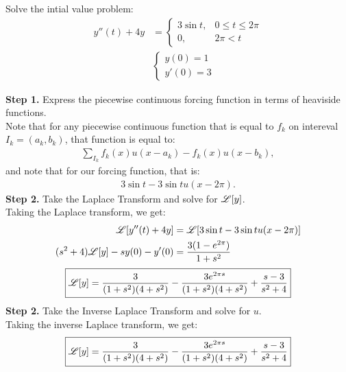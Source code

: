 \documentclass[11pt]{article}
\begin{document}
    \newpage 
    \begin{problem}
        Solve the intial value problem:
        \begin{align}
            y''(t) + 4y &= 
            \begin{cases}
            3\sin t, &0\le t \le 2\pi \\ 
            0, &2\pi<t   \end{cases} \\
            &\begin{cases}
                y(0) = 1 \\
                y'(0) = 3
            \end{cases}
        \end{align}
    \end{problem}
    \begin{solution}
        \textbf{Step 1.} Express the piecewise continuous forcing function in terms of heaviside functions. \\
        Note that for any piecewise continuous function that is equal to $f_k$ on intereval $I_k = (a_k,b_k)$, that function is equal to:
        \begin{align}
            \sum_{I_k} f_k(x)u(x-a_k) - f_k(x)u(x-b_k),
        \end{align}
        and note that for our forcing function, that is:
        \begin{align}
            \boxed{3\sin t - 3\sin t u(x-2\pi).}
        \end{align}
        \textbf{Step 2.} Take the Laplace Transform and solve for $\mathscr L[y]$. \\
        Taking the Laplace transform, we get:
        \begin{align}
            \mathscr L[y''(t) + 4y] &= \mathscr L[3\sin t - 3\sin t u(x-2\pi)] \\
            (s^2+4)\mathscr L[y] - sy(0)-y'(0) &= \dfrac{3(1-e^{2\pi})}{1+s^2}
        \end{align}
        \begin{align}
            \boxed{\mathscr L[y] = \dfrac{3}{(1+s^2)(4+s^2)} - \dfrac{3e^{2\pi s}}{(1+s^2)(4+s^2)}+ \dfrac{s-3}{s^2+4}}
        \end{align}
        \textbf{Step 2.} Take the Inverse Laplace Transform and solve for $u$. \\
        Taking the inverse Laplace transform, we get:
        \begin{align}
            \boxed{\mathscr L[y] = \dfrac{3}{(1+s^2)(4+s^2)} - \dfrac{3e^{2\pi s}}{(1+s^2)(4+s^2)}+ \dfrac{s-3}{s^2+4}}
        \end{align}
    \end{solution}
\end{document}
